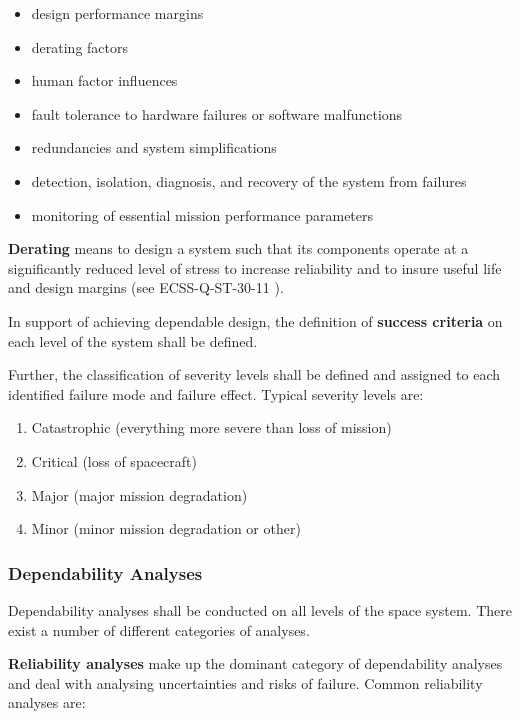 \begin{itemize}
\item design performance margins
\item derating factors
\item human factor influences
\item fault tolerance to hardware failures or software malfunctions
\item redundancies and system simplifications
\item detection, isolation, diagnosis, and recovery of the system from failures
\item monitoring of essential mission performance parameters
\end{itemize}

\textbf{Derating} means to design a system such that its components operate at a significantly reduced level of stress to increase reliability and to insure useful life and design margins (see ECSS-Q-ST-30-11 \cite{ECSS-Q-ST-30-11}).

In support of achieving dependable design, the definition of \textbf{success criteria} on each level of the system shall be defined.

Further, the classification of severity levels shall be defined and assigned to each identified failure mode and failure effect. Typical severity levels are:

\begin{enumerate}
\item Catastrophic (everything more severe than loss of mission)
\item Critical (loss of spacecraft)
\item Major (major mission degradation)
\item Minor (minor mission degradation or other)
\end{enumerate}

\subsubsection{Dependability Analyses}

Dependability analyses shall be conducted on all levels of the space system. There exist a number of different categories of analyses.

\textbf{Reliability analyses} make up the dominant category of dependability analyses and deal with analysing uncertainties and risks of failure. Common reliability analyses are:

